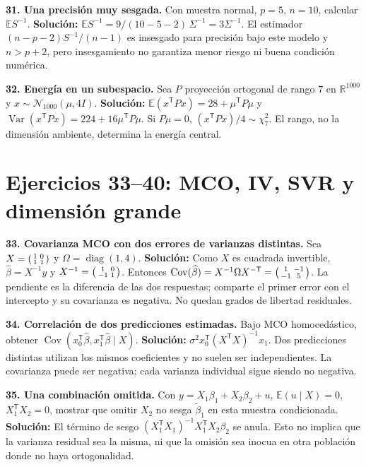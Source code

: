 \documentclass[11pt,a4paper]{article}
\newcommand{\R}{\mathbb R}
\newcommand{\E}{\mathbb E}
\newcommand{\T}{^{\mathsf T}}
\DeclareMathOperator{\Var}{Var}
\DeclareMathOperator{\Cov}{Cov}
\DeclareMathOperator{\diag}{diag}
\theoremstyle{definition}
\begin{document}
\textbf{31. Una precisión muy sesgada.} Con muestra normal, $p=5$, $n=10$, calcular $\E S^{-1}$.\quad
\textbf{Solución:} $\E S^{-1}=9/(10-5-2)\,\Sigma^{-1}=3\Sigma^{-1}$. El estimador $(n-p-2)S^{-1}/(n-1)$ es insesgado para precisión bajo este modelo y $n>p+2$, pero insesgamiento no garantiza menor riesgo ni buena condición numérica.

\textbf{32. Energía en un subespacio.} Sea $P$ proyección ortogonal de rango $7$ en $\R^{1000}$ y $x\sim\mathcal N_{1000}(\mu,4I)$.\quad
\textbf{Solución:} $\E(x\T Px)=28+\mu\T P\mu$ y $\Var(x\T Px)=224+16\mu\T P\mu$. Si $P\mu=0$, $(x\T Px)/4\sim\chi^2_7$. El rango, no la dimensión ambiente, determina la energía central.

\section{Ejercicios 33--40: MCO, IV, SVR y dimensión grande}
\textbf{33. Covarianza MCO con dos errores de varianzas distintas.} Sea $X=\begin{psmallmatrix}1&0\\1&1\end{psmallmatrix}$ y $\Omega=\diag(1,4)$.\quad
\textbf{Solución:} Como $X$ es cuadrada invertible, $\widehat\beta=X^{-1}y$ y $X^{-1}=\begin{psmallmatrix}1&0\\-1&1\end{psmallmatrix}$. Entonces $\Cov(\widehat\beta)=X^{-1}\Omega X^{-\mathsf T}=\begin{psmallmatrix}1&-1\\-1&5\end{psmallmatrix}$. La pendiente es la diferencia de las dos respuestas; comparte el primer error con el intercepto y su covarianza es negativa. No quedan grados de libertad residuales.

\textbf{34. Correlación de dos predicciones estimadas.} Bajo MCO homocedástico, obtener $\Cov(x_0\T\widehat\beta,x_1\T\widehat\beta\mid X)$.\quad
\textbf{Solución:} $\sigma^2x_0\T(X\T X)^{-1}x_1$. Dos predicciones distintas utilizan los mismos coeficientes y no suelen ser independientes. La covarianza puede ser negativa; cada varianza individual sigue siendo no negativa.

\textbf{35. Una combinación omitida.} Con $y=X_1\beta_1+X_2\beta_2+u$, $\E(u\mid X)=0$, $X_1\T X_2=0$, mostrar que omitir $X_2$ no sesga $\widetilde\beta_1$ en esta muestra condicionada.\quad
\textbf{Solución:} El término de sesgo $(X_1\T X_1)^{-1}X_1\T X_2\beta_2$ se anula. Esto no implica que la varianza residual sea la misma, ni que la omisión sea inocua en otra población donde no haya ortogonalidad.
\end{document}
